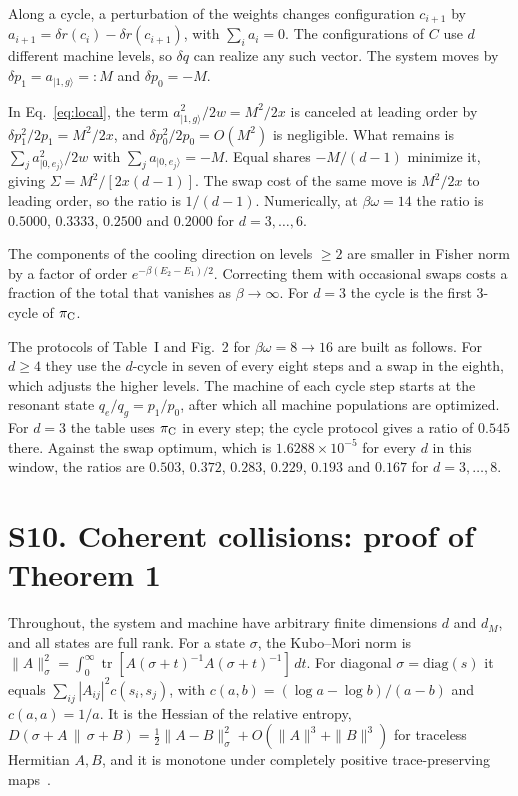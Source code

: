 \documentclass[aps,prl,reprint,superscriptaddress,amsmath,amssymb]{revtex4-2}
\newcommand{\Tr}{\operatorname{tr}}
\newcommand{\Dr}[2]{D(#1\,\|\,#2)}
\begin{document}
Along a cycle, a perturbation of the weights changes configuration $c_{i+1}$ by $a_{i+1}=\delta r(c_i)-\delta r(c_{i+1})$,
with $\sum_ia_i=0$. The configurations of $C$ use $d$ different machine levels, so $\delta q$ can realize any such vector.
The system moves by $\delta p_1=a_{|1,g\rangle}=:M$ and $\delta p_0=-M$.

In Eq.~\eqref{eq:local}, the term $a_{|1,g\rangle}^2/2w=M^2/2x$ is canceled at leading order by $\delta p_1^2/2p_1=M^2/2x$,
and $\delta p_0^2/2p_0=O(M^2)$ is negligible. What remains is $\sum_ja_{|0,e_j\rangle}^2/2w$ with
$\sum_ja_{|0,e_j\rangle}=-M$. Equal shares $-M/(d-1)$ minimize it, giving $\Sigma=M^2/[2x(d-1)]$. The swap cost of the
same move is $M^2/2x$ to leading order, so the ratio is $1/(d-1)$. Numerically, at $\beta\omega=14$ the ratio is
$0.5000$, $0.3333$, $0.2500$ and $0.2000$ for $d=3,\dots,6$.

The components of the cooling direction on levels $\geq2$ are smaller in Fisher norm by a factor of order
$e^{-\beta(E_2-E_1)/2}$. Correcting them with occasional swaps costs a fraction of the total that vanishes as
$\beta\to\infty$. For $d=3$ the cycle is the first $3$-cycle of $\pi_{\rm C}$.

The protocols of Table~I and Fig.~2 for $\beta\omega=8\to16$ are built as follows. For $d\geq4$ they use the $d$-cycle
in seven of every eight steps and a swap in the eighth, which adjusts the higher levels. The machine of each cycle step
starts at the resonant state $q_e/q_g=p_1/p_0$, after which all machine populations are optimized. For $d=3$ the table
uses $\pi_{\rm C}$ in every step; the cycle protocol gives a ratio of $0.545$ there. Against the swap optimum, which is
$1.6288\times10^{-5}$ for every $d$ in this window, the ratios are $0.503$, $0.372$, $0.283$, $0.229$, $0.193$ and
$0.167$ for $d=3,\dots,8$.

\section{S10. Coherent collisions: proof of Theorem 1}
Throughout, the system and machine have arbitrary finite dimensions $d$ and $d_M$, and all states are full rank. For a
state $\sigma$, the Kubo--Mori norm is $\|A\|_\sigma^2=\int_0^\infty\Tr[A(\sigma+t)^{-1}A(\sigma+t)^{-1}]\,dt$. For
diagonal $\sigma=\mathrm{diag}(s)$ it equals $\sum_{ij}|A_{ij}|^2c(s_i,s_j)$, with $c(a,b)=(\log a-\log b)/(a-b)$ and
$c(a,a)=1/a$. It is the Hessian of the relative entropy, $\Dr{\sigma+A}{\sigma+B}=\tfrac12\|A-B\|^2_\sigma+O(\|A\|^3+\|B\|^3)$
for traceless Hermitian $A,B$, and it is monotone under completely positive trace-preserving maps~\cite{Petz1996}.
\end{document}
